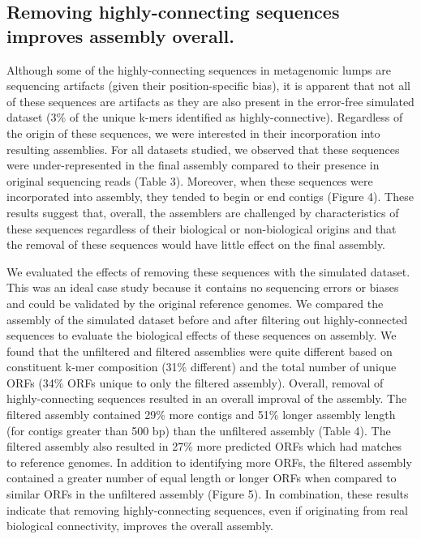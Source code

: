 \documentclass[11pt]{article} %
\begin{document}
\subsection{Removing highly-connecting sequences improves assembly overall.}
Although some of the highly-connecting sequences in metagenomic lumps are sequencing artifacts (given their position-specific bias), it is apparent that not all of these sequences are artifacts as they are also present in the error-free simulated dataset (3\% of the unique k-mers identified as highly-connective). Regardless of the origin of these sequences, we were interested in their incorporation into resulting assemblies.  For all datasets studied, we observed that these sequences were under-represented in the final assembly compared to their presence in original sequencing reads (Table 3).  Moreover, when these sequences were incorporated into assembly, they tended to begin or end contigs (Figure 4).  These results suggest that, overall, the assemblers are challenged by characteristics of these sequences regardless of their biological or non-biological origins and that the removal of these sequences would have little effect on the final assembly. 

We evaluated the effects of removing these sequences with the simulated dataset.  This was an ideal case study because it contains no sequencing errors or biases and could be validated by the original reference genomes.  We compared the assembly of the simulated dataset before and after filtering out highly-connected sequences to evaluate the biological effects of these sequences on assembly.  We found that the unfiltered and filtered assemblies were quite different based on constituent k-mer composition (31\% different) and the total number of unique ORFs (34\% ORFs unique to only the filtered assembly).  Overall, removal of highly-connecting sequences resulted in an overall improval of the assembly.  The filtered assembly contained 29\% more contigs and 51\% longer assembly length (for contigs greater than 500 bp) than the unfiltered assembly (Table 4).  The filtered assembly also resulted in 27\% more predicted ORFs which had matches to reference genomes.  In addition to identifying more ORFs, the filtered assembly contained a greater number of equal length or longer ORFs when compared to similar ORFs in the unfiltered assembly (Figure 5).  In combination, these results indicate that removing highly-connecting sequences, even if originating from real biological connectivity, improves the overall assembly.  
\end{document}
